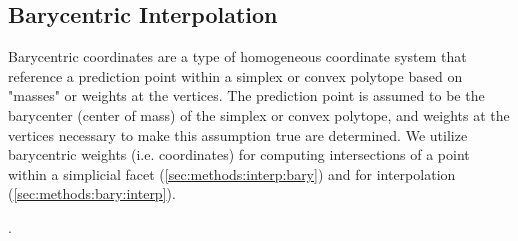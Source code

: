 \documentclass[preprint,12pt]{elsarticle}
\begin{document}

\subsection{Barycentric Interpolation}

Barycentric coordinates are a type of homogeneous coordinate system that reference a prediction point within a simplex \cite{langerSphericalBarycentricCoordinates2006} or convex polytope \cite{floaterGeneralizedBarycentricCoordinates2015,meyerGeneralizedBarycentricCoordinates2002,langerSphericalBarycentricCoordinates2006} based on "masses" or weights at the vertices. The prediction point is assumed to be the barycenter (center of mass) of the simplex or convex polytope, and weights at the vertices necessary to make this assumption true are determined. We utilize barycentric weights (i.e. coordinates) for computing intersections of a point within a simplicial facet (\cref{sec:methods:interp:bary}) and for interpolation \cite{langerSphericalBarycentricCoordinates2006} (\cref{sec:methods:bary:interp}).

.
\end{document}
